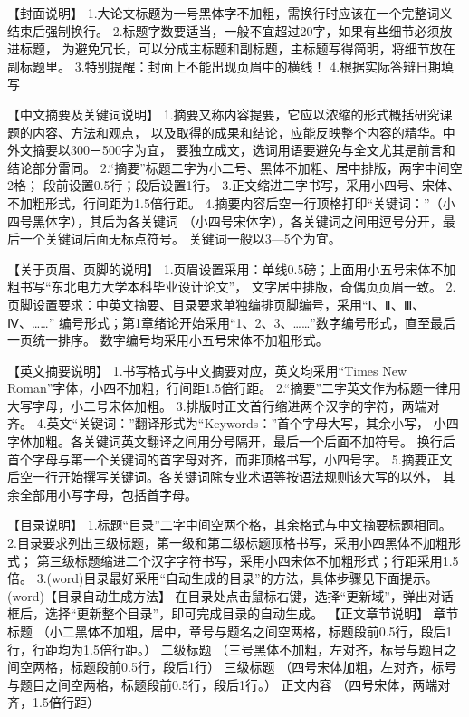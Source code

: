 【封面说明】
1.大论文标题为一号黑体字不加粗，需换行时应该在一个完整词义结束后强制换行。
2.标题字数要适当，一般不宜超过20字，如果有些细节必须放进标题，
为避免冗长，可以分成主标题和副标题，主标题写得简明，将细节放在副标题里。
3.特别提醒：封面上不能出现页眉中的横线！
4.根据实际答辩日期填写

【中文摘要及关键词说明】
1.摘要又称内容提要，它应以浓缩的形式概括研究课题的内容、方法和观点，
以及取得的成果和结论，应能反映整个内容的精华。中外文摘要以300－500字为宜，
要独立成文，选词用语要避免与全文尤其是前言和结论部分雷同。
2.“摘要”标题二字为小二号、黑体不加粗、居中排版，两字中间空2格；
段前设置0.5行；段后设置1行。
3.正文缩进二字书写，采用小四号、宋体、不加粗形式，行间距为1.5倍行距。
4.摘要内容后空一行顶格打印“关键词：”（小四号黑体字），其后为各关键词
（小四号宋体字），各关键词之间用逗号分开，最后一个关键词后面无标点符号。
关键词一般以3—5个为宜。

【关于页眉、页脚的说明】
1.页眉设置采用：单线0.5磅；上面用小五号宋体不加粗书写“东北电力大学本科毕业设计论文”，
文字居中排版，奇偶页页眉一致。
2.页脚设置要求：中英文摘要、目录要求单独编排页脚编号，采用“Ⅰ、Ⅱ、Ⅲ、Ⅳ、……”
编号形式；第1章绪论开始采用“1、2、3、……”数字编号形式，直至最后一页统一排序。
数字编号均采用小五号宋体不加粗形式。

【英文摘要说明】
1.书写格式与中文摘要对应，英文均采用“Times New Roman”字体，小四不加粗，行间距1.5倍行距。
2.“摘要”二字英文作为标题一律用大写字母，小二号宋体加粗。
3.排版时正文首行缩进两个汉字的字符，两端对齐。
4.英文“关键词：”翻译形式为“Keywords：”首个字母大写，其余小写，
小四字体加粗。各关键词英文翻译之间用分号隔开，最后一个后面不加符号。
换行后首个字母与第一个关键词的首字母对齐，而非顶格书写，小四号字。
5.摘要正文后空一行开始撰写关键词。各关键词除专业术语等按语法规则该大写的以外，
其余全部用小写字母，包括首字母。

【目录说明】
1.标题“目录”二字中间空两个格，其余格式与中文摘要标题相同。
2.目录要求列出三级标题，第一级和第二级标题顶格书写，采用小四黑体不加粗形式；
第三级标题缩进二个汉字字符书写，采用小四宋体不加粗形式；行距采用1.5倍。
3.(word)目录最好采用“自动生成的目录”的方法，具体步骤见下面提示。
(word)【目录自动生成方法】
在目录处点击鼠标右键，选择“更新域”，弹出对话框后，选择“更新整个目录”，即可完成目录的自动生成。
【正文章节说明】
章节标题
（小二黑体不加粗，居中，章号与题名之间空两格，标题段前0.5行，段后1行，行距均为1.5倍行距。）
二级标题
（三号黑体不加粗，左对齐，标号与题目之间空两格，标题段前0.5行，段后1行）
三级标题
（四号宋体加粗，左对齐，标号与题目之间空两格，标题段前0.5行，段后1行。）
正文内容
（四号宋体，两端对齐，1.5倍行距）


